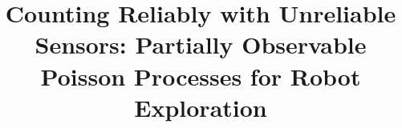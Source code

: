 \documentclass[twoside,11pt]{article}
\begin{document}
	
\newcommand{\tp}{\textrm{\textit{tp}}}
\newcommand{\fp}{\textrm{\textit{fp}}}
\newcommand{\tpr}{\textrm{\textit{tpr}}}
\newcommand{\fnr}{\textrm{\textit{fnr}}}
\newcommand{\fpr}{\textrm{\textit{fpr}}}
\newcommand{\tnr}{\textrm{\textit{tnr}}}
\newtheorem{definition2}[subsection]{Definition}	

\title{Counting Reliably with Unreliable Sensors: Partially Observable Poisson Processes for Robot Exploration}

\author{%
   }


\maketitle








% 







%

\vskip 0.2in




\end{document}

